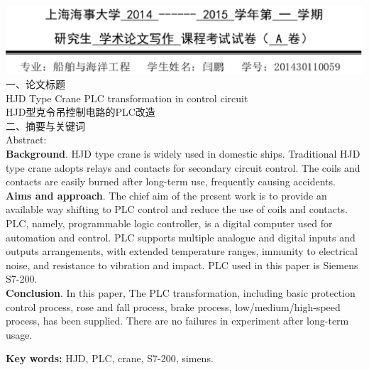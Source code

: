 \documentclass[a4paper]{article}
\renewcommand{\Large}{\fontsize{12pt}{\baselineskip}\selectfont}
\begin{document}
	\thispagestyle{fancy}
\includegraphics{header.eps} \\
{ \Large 一、论文标题} \\
{\Large HJD Type Crane PLC transformation in control circuit \\
	\Large HJD型克令吊控制电路的PLC改造} \\
{ \Large 二、摘要与关键词} \\
{ \Large Abstract:} \\
\textbf{Background}. HJD type crane is widely used in domestic ships. Traditional HJD type crane adopts relays and contacts for secondary circuit control. The coils and contacts are easily burned after long-term use, frequently causing accidents. \\
\textbf{Aims and approach}. The chief aim of the present work is to provide an available way shifting to PLC control and reduce the use of coils and contacts. PLC, namely, programmable logic controller, is a digital computer used for automation and control. PLC supports multiple analogue and digital inputs and outputs arrangements, with extended temperature ranges, immunity to electrical noise, and resistance to vibration and impact. PLC used in this paper is Siemens S7-200.\\
\textbf{Conclusion}. In this paper, The PLC transformation, including basic protection control process, rose and fall process, brake process, low/medium/high-speed process, has been supplied. There are no failures in experiment after long-term usage. 

{ \textbf{\Large Key words: }}HJD, PLC, crane, S7-200, simens.
\end{document}

